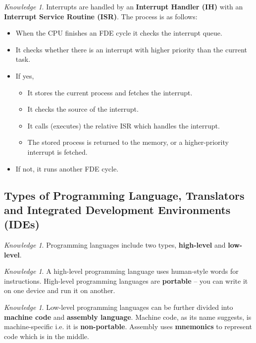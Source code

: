 \documentclass[8pt]{article}
\theoremstyle{remark}
\newtheorem{knowledge}[method]{Knowledge}
\begin{document}
            \begin{knowledge}
                Interrupts are handled by an \textbf{Interrupt Handler (IH)} with an \textbf{Interrupt Service Routine (ISR)}. The process is as follows:
                \begin{itemize}
                    \item When the CPU finishes an FDE cycle it checks the interrupt queue.
                    \item It checks whether there is an interrupt with higher priority than the current task.
                    \item If yes,
                    \begin{itemize}
                        \item It stores the current process and fetches the interrupt.
                        \item It checks the source of the interrupt.
                        \item It calls (executes) the relative ISR which handles the interrupt.
                        \item The stored process is returned to the memory, or a higher-priority interrupt is fetched.
                    \end{itemize}
                    \item If not, it runs another FDE cycle.
                \end{itemize}
            \end{knowledge}

        \subsection{Types of Programming Language, Translators and Integrated Development Environments (IDEs)}
            \begin{knowledge}
                Programming languages include two types, \textbf{high-level} and \textbf{low-level}.
            \end{knowledge}
            
            \begin{knowledge}
                A high-level programming language uses human-style words for instructions. High-level programming languages are \textbf{portable} -- you can write it on one device and run it on another.
            \end{knowledge}

            \begin{knowledge}
                Low-level programming languages can be further divided into \textbf{machine code} and \textbf{assembly language}. Machine code, as its name suggests, is machine-specific i.e. it is \textbf{non-portable}. Assembly uses \textbf{mnemonics} to represent code which is in the middle.
            \end{knowledge}
\end{document}
